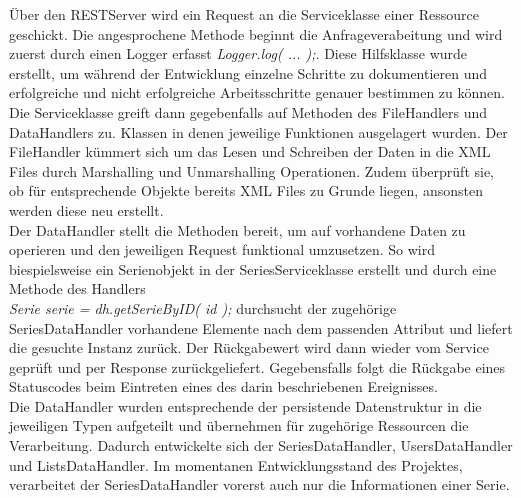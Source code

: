 Über den RESTServer wird ein Request an die Serviceklasse einer Ressource geschickt. Die angesprochene Methode beginnt die Anfrageverabeitung und wird zuerst durch einen Logger erfasst \textit{  Logger.log( ... );}. Diese Hilfsklasse wurde erstellt, um während der Entwicklung einzelne Schritte zu dokumentieren und erfolgreiche und nicht erfolgreiche Arbeitsschritte genauer bestimmen zu können. Die Serviceklasse greift dann gegebenfalls auf Methoden des FileHandlers und DataHandlers zu. Klassen in denen jeweilige Funktionen ausgelagert wurden. Der FileHandler kümmert sich um das Lesen und Schreiben der Daten in die XML Files durch Marshalling und Unmarshalling Operationen. Zudem überprüft sie, ob für entsprechende Objekte bereits XML Files zu Grunde liegen, ansonsten werden diese neu erstellt.\\
Der DataHandler stellt die Methoden bereit, um auf vorhandene Daten zu operieren und den jeweiligen Request funktional umzusetzen. So wird biespielsweise ein Serienobjekt in der SeriesServiceklasse erstellt und durch eine Methode des Handlers \\\textit{Serie serie = dh.getSerieByID( id );} durchsucht der zugehörige SeriesDataHandler  vorhandene Elemente nach dem passenden Attribut und liefert die gesuchte Instanz zurück. Der Rückgabewert wird dann wieder vom Service geprüft und per Response zurückgeliefert. Gegebensfalls folgt die Rückgabe eines Statuscodes beim Eintreten eines des darin beschriebenen Ereignisses.\\
Die DataHandler wurden entsprechende der persistende Datenstruktur in die jeweiligen Typen aufgeteilt und übernehmen für zugehörige Ressourcen die Verarbeitung. Dadurch entwickelte sich der SeriesDataHandler, UsersDataHandler und ListsDataHandler. Im momentanen Entwicklungsstand des Projektes, verarbeitet der SeriesDataHandler vorerst auch nur die Informationen einer Serie.

